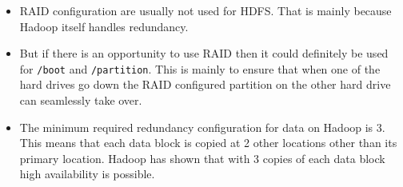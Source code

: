 \documentclass[11pt]{article}
\begin{document}
\begin{itemize}
\item
  RAID configuration are usually not used for HDFS. That is mainly
  because Hadoop itself handles redundancy.
\item
  But if there is an opportunity to use RAID then it could definitely be
  used for \texttt{/boot} and \texttt{/partition}. This is mainly to ensure that when one
  of the hard drives go down the RAID configured partition on the other
  hard drive can seamlessly take over.
\item
  The minimum required redundancy configuration for data on Hadoop is 3.
  This means that each data block is copied at 2 other locations other
  than its primary location. Hadoop has shown that with 3 copies of each
  data block high availability is possible.
\end{itemize}
\end{document}
